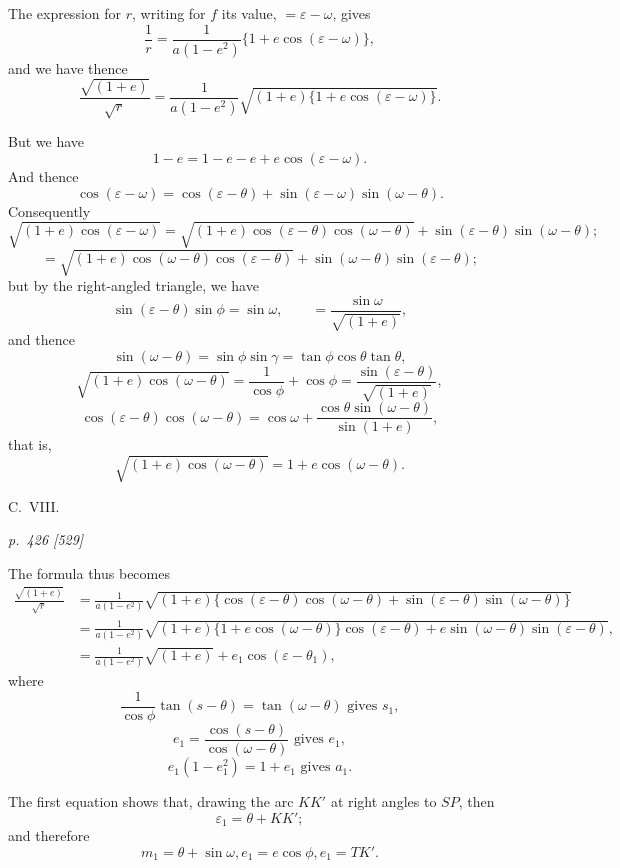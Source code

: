 \documentclass[11pt,a4paper]{book}
\begin{document}
The expression for $r$, writing for $f$ its value, $= \varepsilon - \omega$, gives
\[
\frac{1}{r} = \frac{1}{a(1 - e^2)}\{1 + e\cos(\varepsilon - \omega)\},
\]
and we have thence
\[
\frac{\sqrt{(1 + e)}}{\sqrt{r}} = \frac{1}{a(1 - e^2)}\sqrt{(1 + e)\{1 + e\cos(\varepsilon - \omega)\}}.
\]

But we have
\[
1 - e = 1 - e - e + e\cos(\varepsilon - \omega).
\]
And thence
\[
\cos(\varepsilon - \omega) = \cos(\varepsilon - \theta) + \sin(\varepsilon - \omega)\sin(\omega - \theta).
\]
Consequently
\[
\sqrt{(1 + e)\cos(\varepsilon - \omega)} = \sqrt{(1 + e)\cos(\varepsilon - \theta)\cos(\omega - \theta)} + \sin(\varepsilon - \theta)\sin(\omega - \theta);
\]
\[
= \sqrt{(1 + e)\cos(\omega - \theta)\cos(\varepsilon - \theta)} + \sin(\omega - \theta)\sin(\varepsilon - \theta);
\]
but by the right-angled triangle, we have
\[
\sin(\varepsilon - \theta)\sin\phi = \sin\omega, \qquad = \frac{\sin\omega}{\sqrt{(1 + e)}},
\]
and thence
\[
\sin(\omega - \theta) = \sin\phi\sin\gamma = \tan\phi\cos\theta\tan\theta,
\]
\[
\sqrt{(1 + e)\cos(\omega - \theta)} = \frac{1}{\cos\phi} + \cos\phi = \frac{\sin(\varepsilon - \theta)}{\sqrt{(1 + e)}},
\]
\[
\cos(\varepsilon - \theta)\cos(\omega - \theta) = \cos\omega + \frac{\cos\theta\sin(\omega - \theta)}{\sin(1 + e)},
\]
that is,
\[
\sqrt{(1 + e)\cos(\omega - \theta)} = 1 + e\cos(\omega - \theta).
\]

\bigskip
\hfill{\small C.\ VIII.}

\clearpage

\bigskip
\textit{p.~426 [529]}
\smallskip

The formula thus becomes
\begin{align*}
\frac{\sqrt{(1 + e)}}{\sqrt{r}} &= \frac{1}{a(1 - e^2)}\sqrt{(1 + e)\{\cos(\varepsilon - \theta)\cos(\omega - \theta) + \sin(\varepsilon - \theta)\sin(\omega - \theta)\}}\\
&= \frac{1}{a(1 - e^2)}\sqrt{(1 + e)\{1 + e\cos(\omega - \theta)\}\cos(\varepsilon - \theta) + e\sin(\omega - \theta)\sin(\varepsilon - \theta)},\\
&= \frac{1}{a(1 - e^2)}\sqrt{(1 + e)} + e_1\cos(\varepsilon - \theta_1),
\end{align*}
where
\[
\frac{1}{\cos\phi}\tan(s - \theta) = \tan(\omega - \theta)\text{ gives } s_1,
\]
\[
e_1 = \frac{\cos(s - \theta)}{\cos(\omega - \theta)}\text{ gives } e_1,
\]
\[
e_1(1 - e_1^2) = 1 + e_1\text{ gives } a_1.
\]

The first equation shows that, drawing the arc $KK'$ at right angles to $SP$, then
\[
\varepsilon_1 = \theta + KK';
\]
and therefore
\[
m_1 = \theta + \sin\omega, e_1 = e\cos\phi, e_1 = TK'.
\]
\end{document}
